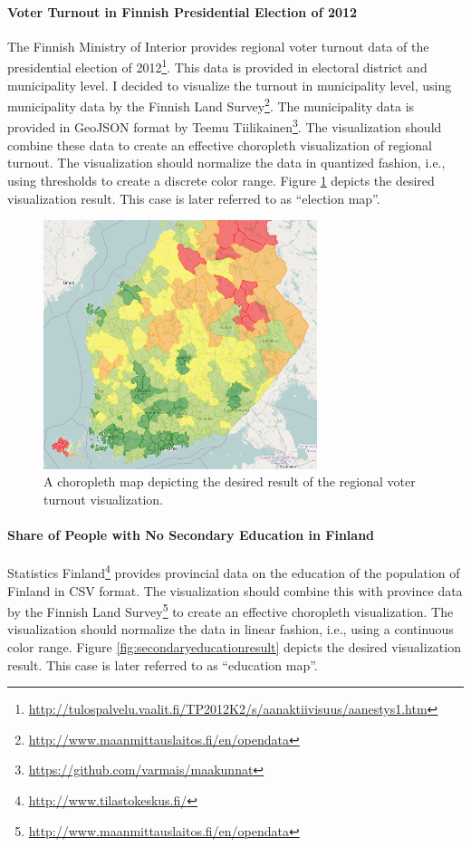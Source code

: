 \paragraph{Voter Turnout in Finnish Presidential Election of 2012}
The Finnish Ministry of Interior provides regional voter turnout data of the presidential election of 2012\footnote{\url{http://tulospalvelu.vaalit.fi/TP2012K2/s/aanaktiivisuus/aanestys1.htm}}. This data is provided in electoral district and municipality level. I decided to visualize the turnout in municipality level, using municipality data by the Finnish Land Survey\footnote{\url{http://www.maanmittauslaitos.fi/en/opendata}}. The municipality data is provided in GeoJSON format by Teemu Tiilikainen\footnote{\url{https://github.com/varmais/maakunnat}}. The visualization should combine these data to create an effective choropleth visualization of regional turnout. The visualization should normalize the data in quantized fashion, i.e., using thresholds to create a discrete color range. Figure \ref{fig:voterturnoutresult} depicts the desired visualization result. This case is later referred to as ``election map''.

\begin{figure}[htbp]
  \begin{center}
    \includegraphics[width=8cm]{images/choropleth-example-thematic.png}
    \caption{A choropleth map depicting the desired result of the regional voter turnout visualization.}
    \label{fig:voterturnoutresult}
  \end{center}
\end{figure}

\paragraph{Share of People with No Secondary Education in Finland}
Statistics Finland\footnote{\url{http://www.tilastokeskus.fi/}} provides provincial data on the education of the population of Finland in CSV format. The visualization should combine this with province data by the Finnish Land Survey\footnote{\url{http://www.maanmittauslaitos.fi/en/opendata}} to create an effective choropleth visualization. The visualization should normalize the data in linear fashion, i.e., using a continuous color range. Figure \ref{fig:secondaryeducationresult} depicts the desired visualization result. This case is later referred to as ``education map''.

